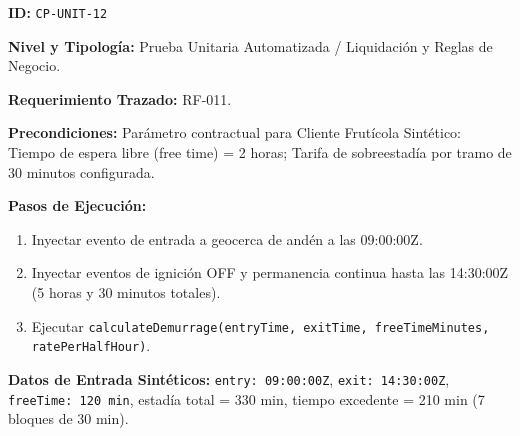 \par\noindent\textbf{ID:} \texttt{C\allowbreak{}P\allowbreak{}-\allowbreak{}U\allowbreak{}N\allowbreak{}I\allowbreak{}T\allowbreak{}-\allowbreak{}1\allowbreak{}2\allowbreak{}}\par
\par\noindent\textbf{Nivel y Tipología:} Prueba Unitaria Automatizada / Liquidación y Reglas de Negocio.\par
\par\noindent\textbf{Requerimiento Trazado:} RF-011.\par
\par\noindent\textbf{Precondiciones:} Parámetro contractual para Cliente Frutícola Sintético: Tiempo de espera libre (free time) = 2 horas; Tarifa de sobreestadía por tramo de 30 minutos configurada.\par
\par\noindent\textbf{Pasos de Ejecución:} \par
\begin{enumerate}
\item Inyectar evento de entrada a geocerca de andén a las 09:00:00Z.
\item Inyectar eventos de ignición OFF y permanencia continua hasta las 14:30:00Z (5 horas y 30 minutos totales).
\item Ejecutar \texttt{c\allowbreak{}a\allowbreak{}l\allowbreak{}c\allowbreak{}u\allowbreak{}l\allowbreak{}a\allowbreak{}t\allowbreak{}e\allowbreak{}D\allowbreak{}e\allowbreak{}m\allowbreak{}u\allowbreak{}r\allowbreak{}r\allowbreak{}a\allowbreak{}g\allowbreak{}e\allowbreak{}(\allowbreak{}e\allowbreak{}n\allowbreak{}t\allowbreak{}r\allowbreak{}y\allowbreak{}T\allowbreak{}i\allowbreak{}m\allowbreak{}e\allowbreak{},\allowbreak{} e\allowbreak{}x\allowbreak{}i\allowbreak{}t\allowbreak{}T\allowbreak{}i\allowbreak{}m\allowbreak{}e\allowbreak{},\allowbreak{} f\allowbreak{}r\allowbreak{}e\allowbreak{}e\allowbreak{}T\allowbreak{}i\allowbreak{}m\allowbreak{}e\allowbreak{}M\allowbreak{}i\allowbreak{}n\allowbreak{}u\allowbreak{}t\allowbreak{}e\allowbreak{}s\allowbreak{},\allowbreak{} r\allowbreak{}a\allowbreak{}t\allowbreak{}e\allowbreak{}P\allowbreak{}e\allowbreak{}r\allowbreak{}H\allowbreak{}a\allowbreak{}l\allowbreak{}f\allowbreak{}H\allowbreak{}o\allowbreak{}u\allowbreak{}r\allowbreak{})\allowbreak{}}.
\end{enumerate}
\par\noindent\textbf{Datos de Entrada Sintéticos:} \texttt{e\allowbreak{}n\allowbreak{}t\allowbreak{}r\allowbreak{}y\allowbreak{}:\allowbreak{} 0\allowbreak{}9\allowbreak{}:\allowbreak{}0\allowbreak{}0\allowbreak{}:\allowbreak{}0\allowbreak{}0\allowbreak{}Z\allowbreak{}}, \texttt{e\allowbreak{}x\allowbreak{}i\allowbreak{}t\allowbreak{}:\allowbreak{} 1\allowbreak{}4\allowbreak{}:\allowbreak{}3\allowbreak{}0\allowbreak{}:\allowbreak{}0\allowbreak{}0\allowbreak{}Z\allowbreak{}}, \texttt{f\allowbreak{}r\allowbreak{}e\allowbreak{}e\allowbreak{}T\allowbreak{}i\allowbreak{}m\allowbreak{}e\allowbreak{}:\allowbreak{} 1\allowbreak{}2\allowbreak{}0\allowbreak{} m\allowbreak{}i\allowbreak{}n\allowbreak{}}, estadía total = 330 min, tiempo excedente = 210 min (7 bloques de 30 min).\par
